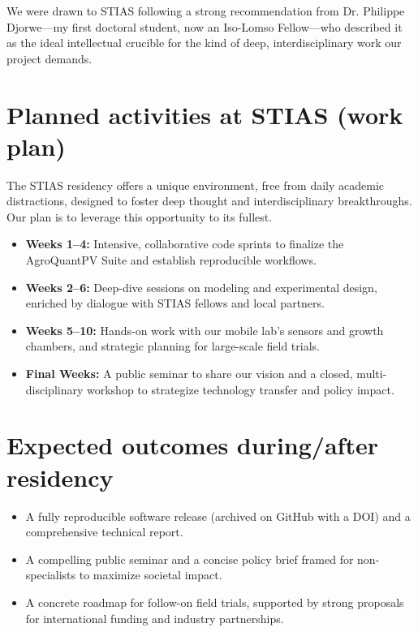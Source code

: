 \documentclass[11pt,a4paper]{article}
\begin{document}
We were drawn to STIAS following a strong recommendation from Dr. Philippe Djorwe—my first doctoral student, now an Iso-Lomso Fellow—who described it as the ideal intellectual crucible for the kind of deep, interdisciplinary work our project demands.

\section*{Planned activities at STIAS (work plan)}

The STIAS residency offers a unique environment, free from daily academic distractions, designed to foster deep thought and interdisciplinary breakthroughs. Our plan is to leverage this opportunity to its fullest.
\begin{itemize}
  \item \textbf{Weeks 1–4:} Intensive, collaborative code sprints to finalize the AgroQuantPV Suite and establish reproducible workflows.
  \item \textbf{Weeks 2–6:} Deep-dive sessions on modeling and experimental design, enriched by dialogue with STIAS fellows and local partners.
  \item \textbf{Weeks 5–10:} Hands-on work with our mobile lab's sensors and growth chambers, and strategic planning for large-scale field trials.
  \item \textbf{Final Weeks:} A public seminar to share our vision and a closed, multi-disciplinary workshop to strategize technology transfer and policy impact.
\end{itemize}

\section*{Expected outcomes during/after residency}

\begin{itemize}
  \item A fully reproducible software release (archived on GitHub with a DOI) and a comprehensive technical report.
  \item A compelling public seminar and a concise policy brief framed for non-specialists to maximize societal impact.
  \item A concrete roadmap for follow-on field trials, supported by strong proposals for international funding and industry partnerships.
\end{itemize}
\end{document}
